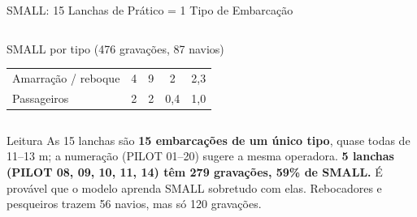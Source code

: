 \documentclass[aspectratio=169]{beamer}
\begin{document}
\begin{frame}{SMALL: 15 Lanchas de Prático = 1 Tipo de Embarcação}
\begin{columns}[t]
\begin{block}{\small SMALL por tipo (476 gravações, 87 navios)}
\begin{tabular}{lcccc}
            Amarração / reboque & 4 & 9 & 2 & 2,3 \\
            Passageiros & 2 & 2 & 0,4 & 1,0 \\
            \bottomrule
            \end{tabular}
        \end{block}
    \end{columns}
    \vspace{0.05cm}
    \begin{alertblock}{Leitura}
        \scriptsize
        As 15 lanchas são \textbf{15 embarcações de um único tipo}, quase todas de 11--13 m; a numeração (PILOT 01--20) sugere a mesma operadora. \textbf{5 lanchas (PILOT 08, 09, 10, 11, 14) têm 279 gravações, 59\% de SMALL.} É provável que o modelo aprenda SMALL sobretudo com elas. Rebocadores e pesqueiros trazem 56 navios, mas só 120 gravações.
    \end{alertblock}
\end{frame}
\end{document}
